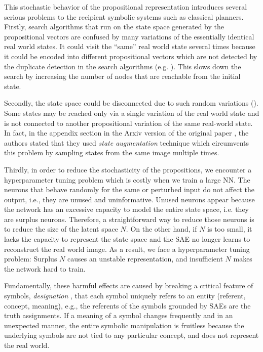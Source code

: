This stochastic behavior of the propositional representation
introduces several serious problems to the recipient symbolic systems such as classical planners.
% 
Firstly,
search algorithms that run on the state space generated by the propositional vectors
are confused by many variations of the essentially identical real world states.
It could visit the ``same'' real world state several times because
it could be encoded into different propositional vectors
which are not detected by the duplicate detection in the search algorithms (e.g. \astar).
This slows down the search by increasing the number of nodes that are reachable from the initial state.

Secondly, the state space could be disconnected due to such random variations ().
Some states may be reached only via a single variation of the real world state and is not connected to
another propositional variation of the same real-world state.
In fact, in the appendix section in the Arxiv version of the original paper \cite{Asai2018},
the authors stated that they used \emph{state augmentation} technique
which circumvents this problem by sampling states from the same image multiple times.

Thirdly, in order to reduce the stochasticity of the propositions, we encounter a hyperparameter tuning problem
which is costly when we train a large NN.
% 
The neurons that behave randomly for the same or perturbed input do not affect the output,
i.e., they are unused and uninformative.
Unused neurons appear because the network has an excessive capacity to 
model the entire state space, i.e. they are surplus neurons.
Therefore, a straightforward way to reduce those neurons is to reduce the size of the latent space $N$.
On the other hand, if $N$ is too small, it lacks the capacity to represent the state space
and the SAE no longer learns to reconstruct the real world image.
As a result, we face a hyperparameter tuning problem: Surplus $N$ causes an unstable representation,
and insufficient $N$ makes the network hard to train.

Fundamentally,
these harmful effects are caused by breaking a critical feature of symbols, \emph{designation} \cite{newell1976computer,newell1980physical},
that each symbol uniquely refers to an entity (referent, concept, meaning),
e.g., the referents of the symbols grounded by SAEs are the truth assignments.
If a meaning of a symbol changes frequently and in an unexpected manner, the entire symbolic manipulation is fruitless
because the underlying symbols are not tied to any particular concept, and does not represent the real world.


